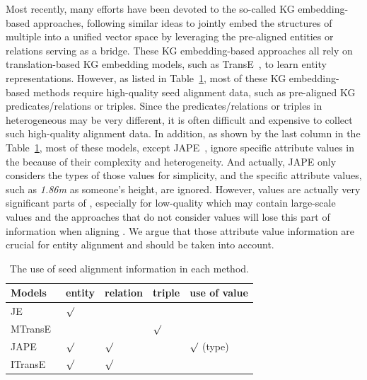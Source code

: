 	Most recently, many efforts have been devoted to the so-called KG embedding-based approaches, following similar ideas to jointly embed
the structures of multiple \KGs into a unified vector space by leveraging the pre-aligned entities or relations serving as a bridge. These
KG embedding-based approaches all rely on translation-based KG embedding models, such as TransE~\cite{bordes2013translating}, to learn
entity representations. However, as listed in Table~\ref{seed}, most of these KG embedding-based methods require high-quality seed
alignment data, such as pre-aligned KG predicates/relations or triples. Since the predicates/relations or triples in heterogeneous \KGs may
be very different, it is often difficult and expensive to collect such high-quality alignment data. In addition, as shown by the last
column in the Table~\ref{seed}, most of these models, except JAPE~\cite{sun2017cross}, ignore specific attribute values in the \KGs because
of their complexity and heterogeneity. And actually, JAPE only considers the types of those values for simplicity, and the specific
attribute values, such as \textit{1.86m} as someone's height, are ignored. However, values are actually very significant parts of \KGs, especially for low-quality \KGs which may contain large-scale values and the approaches that do not consider values will lose this part of information when aligning \KGs. We argue that those attribute value information are crucial for entity alignment and should be taken into account. 

	\begin{table}
		\centering
		\scriptsize
		\begin{tabular}{lllll}
			\toprule
			\bf Models & \bf entity & \bf relation & \bf triple & \bf use of value \\
			\midrule
			JE~\cite{hao2016joint} & ${\surd}$ & & & \\
			MTransE~\cite{chen2016multilingual} & $ $ & $ $ & ${\surd}$ & \\
			JAPE~\cite{sun2017cross} & ${\surd}$& ${\surd}$& & ${\surd}$ (type)\\
			ITransE~\cite{zhu2017iterative} & ${\surd}$ & ${\surd}$& & \\
			\bottomrule
		\end{tabular}
		\caption{The use of seed alignment information in each method.}
		\label{seed}
	\end{table}
	
